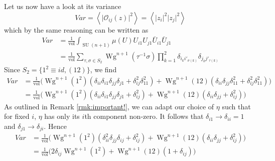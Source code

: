 \documentclass[a4paper,11pt]{article}
\theoremstyle{definition}
\DeclareMathOperator{\SU}{SU}
\DeclareMathOperator{\vol}{vol}
\DeclareMathOperator{\Wg}{Wg}
\newcommand{\OO}{\mathcal O}
\begin{document}
Let us now have a look at its variance
\begin{equation}
  Var = \left\langle \lvert \OO_{ij}(z) \rvert^2  \right\rangle = \left\langle \lvert z_i \rvert^2 \lvert z_j \rvert^2 \right\rangle 
\end{equation}
which by the same reasoning can be written as
\begin{equation}
  \begin{split} 
    Var &= \frac{1}{\vol} \int_{\SU(n+1)} \mu(U) U_{i1}U_{j1}\bar U_{i1} \bar U_{j1} \\
  &= \frac{1}{\vol} \sum_{\tau,\sigma \in S_2} \Wg^{n+1}(\tau^{-1}\sigma) \prod_{k = 1}^2 \delta_{i_k i'_{\sigma(k)}}\delta_{j_k j'_{\tau(k)}} 
  \end{split}
\end{equation}
Since $S_2 = \{ 1^2 \equiv id, (12) \}$, we find
\begin{equation}
  \begin{split} 
    Var &= \frac{1}{\vol} \Big( \Wg^{n+1}(1^2) \left( \delta_{ii}\delta_{i1}\delta_{jj}\delta_{j1} + \delta^2_{ij}\delta^2_{11} \right) +  \Wg^{n+1}(12) \left( \delta_{ii}\delta_{jj}\delta^2_{11} + \delta_{ij}^2\delta^2_{11} \right)\Big) \\
    &= \frac{1}{\vol} \Big( \Wg^{n+1}(1^2) \left( \delta_{ii}\delta_{i1}\delta_{jj}\delta_{j1} + \delta^2_{ij} \right) +  \Wg^{n+1}(12) \left( \delta_{ii}\delta_{jj} + \delta_{ij}^2 \right)\Big) 
  \end{split}
\end{equation}
As outlined in Remark \ref{rmk:important!}, we can adapt our choice of $\eta$ such that for fixed $i$, $\eta$ has only its $i$th component non-zero.
It follows that $\delta_{i1} \to \delta_{ii} = 1$ and $\delta_{j1}\to\delta_{ji}$.
Hence
\begin{equation}
  \begin{split} 
    Var &= \frac{1}{\vol} \Big( \Wg^{n+1}(1^2) \left( \delta^2_{ii}\delta_{jj}\delta_{ij} + \delta^2_{ij} \right) +  \Wg^{n+1}(12) \left( \delta_{ii}\delta_{jj} + \delta_{ij}^2 \right)\Big) \\
    &= \frac{1}{\vol} \Big( 2\delta_{ij}\Wg^{n+1}(1^2) +  \Wg^{n+1}(12) \left( 1  + \delta_{ij} \right)\Big) \\
  \end{split}
\end{equation}
\end{document}
